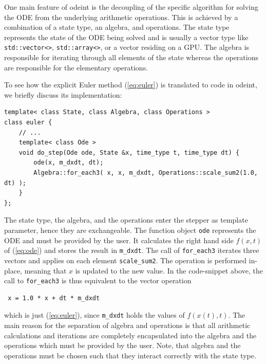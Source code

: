 \documentclass[final]{siamltex}
\newcommand{\code}[1]{\lstinline|#1|}
\newcommand{\eqref}[1]{(\ref{#1})}
\begin{document}
One main feature of odeint is the decoupling of the specific algorithm
for solving the ODE from the underlying arithmetic operations. This
is achieved by a combination of a state type, an algebra, and
operations. The state type represents the state of the ODE being
solved and is usually a vector type like \code{std::vector<>},
\code{std::array<>}, or a vector residing on a GPU. The algebra is
responsible for iterating through all elements of the state whereas
the operations are responsible for the elementary operations.

To see how the explicit Euler method \eqref{eq:euler} is translated to
code in odeint, we briefly discuss its implementation:
\begin{lstlisting}
template< class State, class Algebra, class Operations >
class euler {
    // ...
    template< class Ode >
    void do_step(Ode ode, State &x, time_type t, time_type dt) {
        ode(x, m_dxdt, dt);
        Algebra::for_each3( x, x, m_dxdt, Operations::scale_sum2(1.0, dt) );
    }
};
\end{lstlisting}
The state type, the algebra, and the operations enter the stepper  %
as template parameter, hence they are exchangeable. The function object
\code{ode} represents the ODE and must be provided by the user. It calculates
the right hand side $f(x,t)$ of \eqref{eq:ode} and stores the result in
\code{m_dxdt}. The call of \code{for_each3} iterates three vectors and    %
applies on each element \code{scale_sum2}. The operation is performed
in-place, meaning that $x$ is updated to the new value.
In the code-snippet above, the call to \code{for_each3} is thus equivalent to the vector operation
\begin{lstlisting}
 x = 1.0 * x + dt * m_dxdt
\end{lstlisting}
which is just \eqref{eq:euler}, since \code{m_dxdt} holds the values of $f(x(t), t)$.
The main reason for the separation of algebra and operations is that all arithmetic calculations and
iterations are completely encapsulated into the algebra and the
operations which must be provided by the user. Note, that algebra and
the operations must be chosen such that they interact correctly with
the state type.

\end{document}
